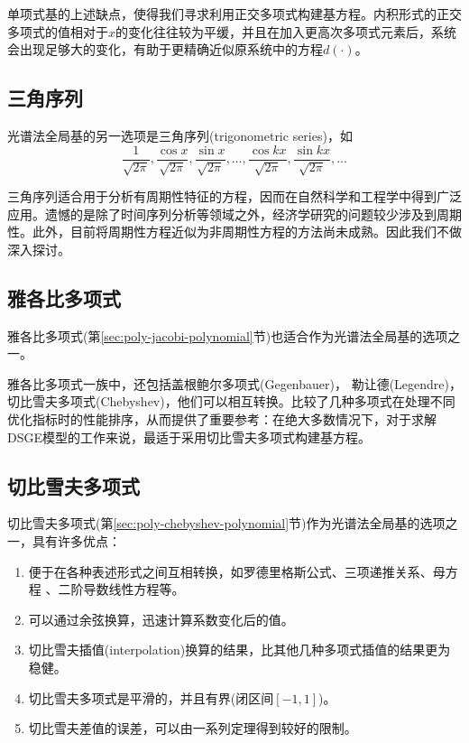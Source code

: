 单项式基的上述缺点，使得我们寻求利用正交多项式构建基方程。内积形式的正交多项式的值相对于$x$的变化往往较为平缓，并且在加入更高次多项式元素后，系统会出现足够大的变化，有助于更精确近似原系统中的方程$d(\cdot)$。

\subsection{三角序列}
\label{sec:pj-base-spectral-trigonometric}
光谱法全局基的另一选项是三角序列(trigonometric series)，如
\begin{equation*}
  \frac{1}{\sqrt{2 \pi}},
  \frac{\cos x}{\sqrt{2 \pi}},
  \frac{\sin x}{\sqrt{2 \pi}},
  \ldots,
  \frac{\cos k x}{\sqrt{2 \pi}},
  \frac{\sin k x}{\sqrt{2 \pi}},
  \ldots
\end{equation*}

三角序列适合用于分析有周期性特征的方程，因而在自然科学和工程学中得到广泛应用。遗憾的是除了时间序列分析等领域之外，经济学研究的问题较少涉及到周期性。此外，目前将周期性方程近似为非周期性方程的方法尚未成熟。因此我们不做深入探讨。

\subsection{雅各比多项式}
\label{sec:pj-base-spectral-jacobi-poly}
雅各比多项式(第\ref{sec:poly-jacobi-polynomial}节)也适合作为光谱法全局基的选项之一。

雅各比多项式一族中，还包括盖根鲍尔多项式(Gegenbauer)， 勒让德(Legendre)，切比雪夫多项式(Chebyshev)，他们可以相互转换。\cite[Table 1]{Boyd:2013kj}比较了几种多项式在处理不同优化指标时的性能排序，从而提供了重要参考：在绝大多数情况下，对于求解DSGE模型的工作来说，最适于采用切比雪夫多项式构建基方程。

\subsection{切比雪夫多项式}
\label{sec:pj-base-spectral-chebyshev-poly}
切比雪夫多项式(第\ref{sec:poly-chebyshev-polynomial}节)作为光谱法全局基的选项之一，具有许多优点：
\begin{enumerate}
  \item 便于在各种表述形式之间互相转换，如罗德里格斯公式、三项递推关系、母方程
  、二阶导数线性方程等。
  \item 可以通过余弦换算，迅速计算系数变化后的值。
  \item 切比雪夫插值(interpolation)换算的结果，比其他几种多项式插值的结果更为稳健。
  \item 切比雪夫多项式是平滑的，并且有界(闭区间$[-1,1]$)。
  \item 切比雪夫差值的误差，可以由一系列定理得到较好的限制。
\end{enumerate}

